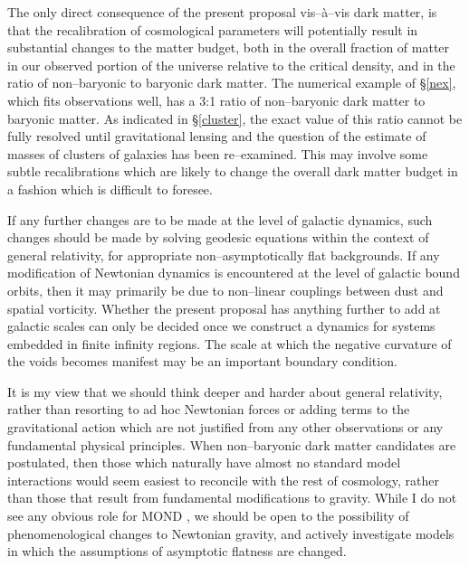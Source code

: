 \documentclass[12pt]{article}
\begin{document}
The only direct consequence of the present proposal vis--\`a--vis dark
matter, is that the recalibration of cosmological parameters will
potentially result in substantial changes to the matter budget, both
in the overall fraction of matter in our observed portion of the universe
relative to the critical density, and in
the ratio of non--baryonic to baryonic dark matter. The numerical example
of \S\ref{nex}, which fits observations well, has a 3:1 ratio of
non--baryonic dark matter to baryonic matter. As indicated in \S\ref{cluster},
the exact value of this ratio cannot be fully resolved until
gravitational lensing and the question of the estimate of masses of
clusters of galaxies has been re--examined. This may involve
some subtle recalibrations which are likely to change the overall
dark matter budget in a fashion which is difficult to foresee.

If any further changes are to be made at the level of galactic dynamics,
such changes should be made by solving geodesic equations within the context
of general relativity, for appropriate non--asymptotically flat backgrounds.
If any modification of Newtonian dynamics is encountered at the level of
galactic bound orbits, then it may primarily be due to non--linear
couplings between dust and spatial vorticity. Whether the present
proposal has anything further to add at galactic scales can only be decided
once we construct a dynamics for systems embedded in finite infinity regions.
The scale at which the negative curvature of the voids becomes manifest
may be an important boundary condition.

It is my view that we should think deeper and harder about general
relativity, rather than resorting to ad hoc Newtonian
forces or adding terms to the gravitational action which are not justified
from any other observations or any fundamental physical principles.
When non--baryonic dark matter candidates are postulated, then those which
naturally have almost no standard model interactions \cite{AKG} would seem
easiest to reconcile with the rest of cosmology, rather than those that
result from fundamental modifications to gravity. While
I do not see any obvious role for MOND \cite{mond}, we should be open to the
possibility of phenomenological changes to Newtonian gravity, and
actively investigate models in which the assumptions of asymptotic flatness
are changed.
\end{document}
